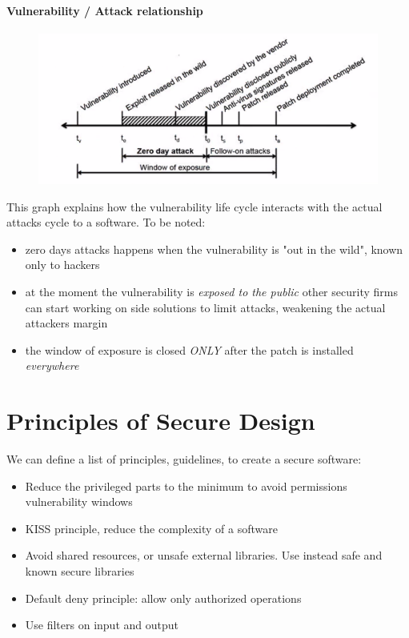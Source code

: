 \documentclass{article}
\begin{document}
			\paragraph{Vulnerability / Attack relationship}
				\begin{figure}[H]
					\centering
					\includegraphics[width = \textwidth]{./images/vulLifeCycle.png}
				\end{figure}
				This graph explains how the vulnerability life cycle interacts with the actual attacks cycle to a software. To be noted:
				\begin{itemize}
					\item zero days attacks happens when the vulnerability is "out in the wild", known only to hackers
					\item at the moment the vulnerability is \emph{exposed to the public} other security firms can start working on side solutions to limit attacks, weakening the actual attackers margin
					\item the window of exposure is closed \emph{ONLY} after the patch is installed \emph{everywhere}
				\end{itemize}
				
		\section{Principles of Secure Design}
			We can define a list of principles, guidelines, to create a secure software:
			\begin{itemize}
				\item Reduce the privileged parts to the minimum to avoid permissions vulnerability windows
				\item KISS principle, reduce the complexity of a software
				\item Avoid shared resources, or unsafe external libraries. Use instead safe and known secure libraries
				\item Default deny principle: allow only authorized operations
				\item Use filters on input and output
			\end{itemize}
			
\end{document}

